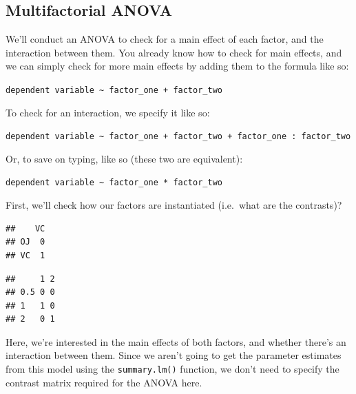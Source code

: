 \documentclass[
]{book}
\newenvironment{Shaded}{\begin{snugshade}}{\end{snugshade}}
\newcommand{\FunctionTok}[1]{\textcolor[rgb]{0.00,0.00,0.00}{#1}}
\newcommand{\NormalTok}[1]{#1}
\newcommand{\SpecialCharTok}[1]{\textcolor[rgb]{0.00,0.00,0.00}{#1}}
\begin{document}
\hypertarget{multifactorial-anova}{%
\subsection{Multifactorial ANOVA}\label{multifactorial-anova}}

We'll conduct an ANOVA to check for a main effect of each factor, and the interaction between them. You already know how to check for main effects, and we can simply check for more main effects by adding them to the formula like so:

\texttt{dependent\ variable\ \textasciitilde{}\ factor\_one\ +\ factor\_two}

To check for an interaction, we specify it like so:

\texttt{dependent\ variable\ \textasciitilde{}\ factor\_one\ +\ factor\_two\ +\ factor\_one\ :\ factor\_two}

Or, to save on typing, like so (these two are equivalent):

\texttt{dependent\ variable\ \textasciitilde{}\ factor\_one\ *\ factor\_two}

First, we'll check how our factors are instantiated (i.e.~what are the contrasts)?

\begin{Shaded}
\end{Shaded}

\begin{verbatim}
##    VC
## OJ  0
## VC  1
\end{verbatim}

\begin{Shaded}
\end{Shaded}

\begin{verbatim}
##     1 2
## 0.5 0 0
## 1   1 0
## 2   0 1
\end{verbatim}

Here, we're interested in the main effects of both factors, and whether there's an interaction between them. Since we aren't going to get the parameter estimates from this model using the \texttt{summary.lm()} function, we don't need to specify the contrast matrix required for the ANOVA here.
\end{document}
